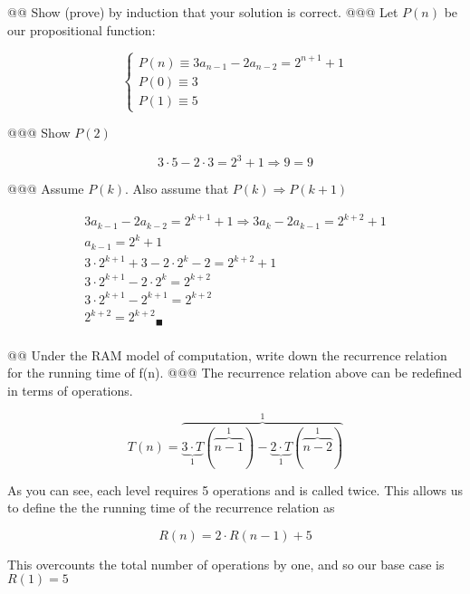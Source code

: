 \documentclass[10pt]{article}
\begin{document}
\begin{easylist}[enumerate]
    @@ Show (prove) by induction that your solution is correct.
    @@@ Let $P(n)$ be our propositional function:

        \[ \begin{cases}
            P(n) \equiv 3 a_{n-1} - 2 a_{n-2} = 2^{n+1} + 1\\
            P(0) \equiv 3\\
            P(1) \equiv 5
        \end{cases} \]

    @@@ Show $P(2)$

        \[ 3 \cdot 5 - 2 \cdot 3 = 2^{3} + 1 \Rightarrow 9 = 9 \]

    @@@ Assume $P(k)$. Also assume that $P(k) \Rightarrow P(k + 1)$

        \[ \begin{aligned}
                3 a_{k-1} - 2 a_{k-2} = 2^{k+1} + 1 \Rightarrow 3 a_{k} - 2 a_{k-1} = 2^{k+2} + 1\\
                a_{k-1} = 2^k + 1\\
                3 \cdot 2^{k + 1} + 3 - 2 \cdot 2^k - 2 = 2^{k+2} + 1\\
                3 \cdot 2^{k+1} - 2 \cdot 2^k = 2^{k+2}\\
                3 \cdot 2^{k+1} - 2^{k+1} = 2^{k+2}\\
                {2^{k+2} = 2^{k+2}}_\blacksquare\\
            \end{aligned} \]

    @@ Under the {\ttfamily RAM} model of computation, write down the recurrence relation for the running time of {\ttfamily f(n)}.
    @@@ The recurrence relation above can be redefined in terms of operations.

        \[ T(n) = \overbrace{\underbrace{3 \cdot T}_1 (\overbrace{n-1}^1) - \underbrace{2 \cdot T}_1 (\overbrace{n-2}^1)}^{1} \]

        As you can see, each level requires 5 operations and is called twice. This allows us to define the the running time of the recurrence relation as

        \[ R(n) = 2 \cdot R(n - 1) + 5 \]

        This overcounts the total number of operations by one, and so our base case is $R(1) = 5$


\end{easylist}
\end{document}
